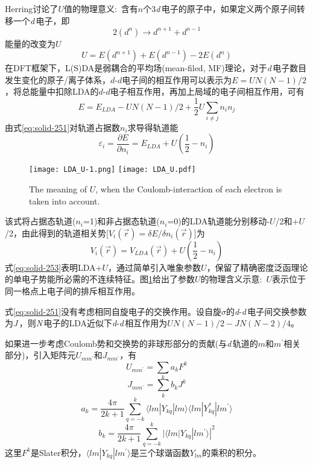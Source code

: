 \textrm{Herring}讨论了$U$值的物理意义:~含有$n$个3{\textit d}\,电子的原子中，如果定义两个原子间转移一个{\textit d}\,电子，即
$$2(d^n)\rightarrow d^{n+1}+d^{n-1}$$
能量的改变为$U$
$$U=E(d^{n+1})+E(d^{n-1})-2E(d^n)$$
在\textrm{DFT}框架下，\textrm{L(S)DA}是弱耦合的平均场(\textrm{mean-filed, MF})理论，对于{\textit d}\,电子数目发生变化的原子/离子体系，$d$-$d$电子间的相互作用可以表示为$E=UN(N-1)/2$\cite{PRB48-16929_1993}，将总能量中扣除LDA的$d$-$d$电子相互作用，再加上局域的电子间相互作用，可有
\begin{equation}
  E=E_{LDA}-UN(N-1)/2+\frac12U\sum_{i\neq j}n_in_j
  \label{eq:solid-251}
\end{equation}
由式\eqref{eq:solid-251}对轨道占据数$n_i$求导得轨道能
\begin{equation}
  \varepsilon_i=\frac{\partial E}{\partial n_i}=E_{LDA}+U(\frac12-n_i)
  \label{eq:solid-252}
\end{equation}
\begin{figure}[h!]
\centering
\texttt{[image: LDA\_U-1.png]}
\texttt{[image: LDA\_U.pdf]}
\caption{\small \textrm{The meaning of $U$, when the Coulomb-interaction of each electron is taken into account.}}%
\label{U_means}
\end{figure}
该式将占据态轨道($n_i$=1)和非占据态轨道($n_i$=0)的LDA轨道能分别移动-$U$/2和+$U$/2，由此得到的轨道相关势[$V_i(\vec r)=\delta E/\delta n_i(\vec r)$]为
\begin{equation}
  V_i(\vec r)=V_{LDA}(\vec r)+U(\frac12-n_i)
  \label{eq:solid-253}
\end{equation}
式\eqref{eq:solid-253}表明\textrm{LDA}+$U$，通过简单引入唯象参数$U$，保留了精确密度泛函理论的单电子势能所必需的不连续特征。图\ref{U_means}给出了参数$U$的物理含义示意:~$U$表示位于同一格点上电子间的排斥相互作用。

式\eqref{eq:solid-251}没有考虑相同自旋电子的交换作用。设自旋$\sigma$的{\textit d}-{\textit d}\,电子间交换参数为{\textit J}\,，则{\textit N}\,电子的LDA近似下{\textit d}-{\textit d}\,相互作用为$UN(N-1)/2-JN(N-2)/4$。

如果进一步考虑Coulomb势和交换势的非球形部分的贡献(与{\textit d}\,轨道的$m$和$m^{\prime}$相关部分)，引入矩阵元$U_{mm^{\prime}}$和$J_{mm^{\prime}}$，有
\begin{equation}
  U_{mm^{\prime}}=\sum_ka_kF^k
  \label{eq:solid-210}
\end{equation}
\begin{equation}
  J_{mm^{\prime}}=\sum_kb_kJ^k
  \label{eq:solid-211}
\end{equation}
\begin{equation}
  a_k=\frac{4\pi}{2k+1}\sum_{q=-k}^k\langle lm|Y_{kq}|lm\rangle\langle lm|Y_{kq}^{\ast}|lm^{\prime}\rangle
  \label{eq:solid-212}
\end{equation}
\begin{equation}
  b_k=\frac{4\pi}{2k+1}\sum_{q=-k}^k|\langle lm|Y_{kq}|lm^{\prime}\rangle|^2
  \label{eq:solid-213}
\end{equation}
这里$F^k$是Slater积分，$\langle lm|Y_{kq}|lm^{\prime}\rangle$是三个球谐函数$Y_{lm}$的乘积的积分。

